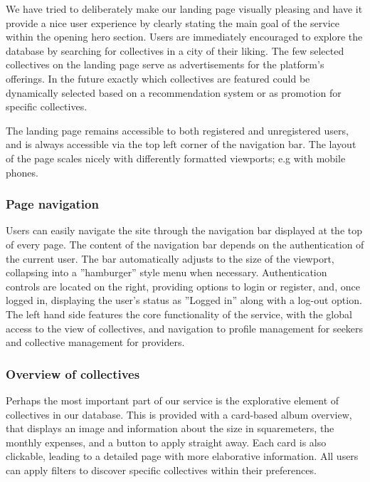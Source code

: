 We have tried to deliberately make our landing page visually pleasing and have it provide a nice user experience by
clearly stating the main goal of the service within the opening hero section.
Users are immediately encouraged to explore the database by searching for collectives in a city of their liking. 
The few selected collectives on the landing page serve as advertisements for the platform's offerings. 
In the future exactly which collectives are featured could be dynamically selected based on a recommendation system or as promotion for specific collectives.

The landing page remains accessible to both registered and unregistered users, and is always 
accessible via the top left corner of the navigation bar. 
The layout of the page scales nicely with differently formatted viewports; e.g with mobile phones. 

\subsubsection{Page navigation}

Users can easily navigate the site through the navigation bar displayed at the top of every page.
The content of the navigation bar depends on the authentication of the current user. 
The bar automatically adjusts to the size of the viewport, collapsing into a ''hamburger'' style menu when necessary. 
Authentication controls are located on the right, providing options to login or register, and, once logged in,
displaying the user's status as ''Logged in'' along with a log-out option. 
The left hand side features the core functionality of the service, with the global access to the view of collectives, 
and navigation to profile management for seekers and collective management for providers.

\subsubsection{Overview of collectives}

Perhaps the most important part of our service is the explorative element of collectives in our database. 
This is provided with a card-based album overview, that displays an image and information about the size in squaremeters, the monthly expenses, 
and a button to apply straight away. 
Each card is also clickable, leading to a detailed page with more elaborative information. 
All users can apply filters to discover specific collectives within their preferences. 

